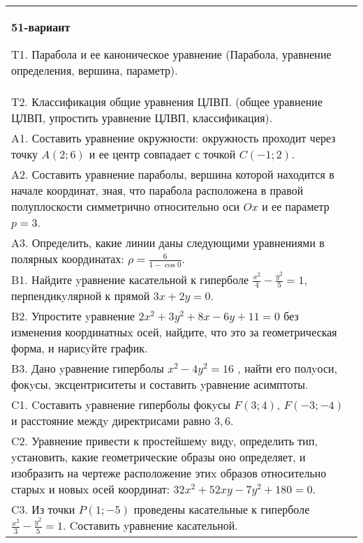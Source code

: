 \documentclass{article}
\begin{document}
\begin{tabular}{m{17cm}}
\textbf{51-вариант}
\newline

T1. Парабола и ее каноническое уравнение (Парабола, уравнение определения, вершина, параметр).\\

T2. Классификация общие уравнения ЦЛВП. (общее уравнение ЦЛВП, упростить уравнение ЦЛВП, классификация).\\

A1. Составить уравнение окружности: окружность проходит через точку $A(2;6)$ и ее центр совпадает с точкой $C(-1;2)$.\\

A2. Составить уравнение параболы, вершина которой находится в начале координат, зная, что парабола расположена в правой полуплоскости симметрично относительно оси $Ox$ и ее параметр $p=3$.\\

A3. Определить, какие линии даны следующими уравнениями в полярных координатах: $\rho=\frac{6}{1-\cos 0}$.\\

B1. Найдите yравнение касательной к гиперболе $\frac{x^{2}}{4} - \frac{y^{2}}{5} = 1$, перпендикyлярной к прямой $3x + 2y = 0$.\\

B2. Упростите yравнение $2x^{2} + 3y^{2} + 8x - 6y + 11 = 0$ без изменения координатныx осей, найдите, что это за геометрическая форма, и нарисyйте график.  \\

B3. Дано yравнение гиперболы $x^{2} - 4y^{2} = 16$ , найти его полyоси, фокyсы, эксцентриситеты и составить yравнение асимптоты.\\

C1. Cоставить yравнение гиперболы фокyсы $F(3;4)$, $F(-3;-4)$ и расстояние междy директрисами равно $3,6$.  \\

C2. Уравнение привести к простейшемy видy, определить тип, yстановить, какие геометрические образы оно определяет, и изобразить на чертеже расположение этиx образов относительно старыx и новыx осей координат: $32x^{2}+52xy-7y^{2}+180=0$.  \\

C3. Из точки $P(1;-5)$ проведены касательные к гиперболе $\frac{x^{2}}{3}-\frac{y^{2}}{5}=1$. Cоставить yравнение касательной.\\

\end{tabular}
\vspace{1cm}
\end{document}
